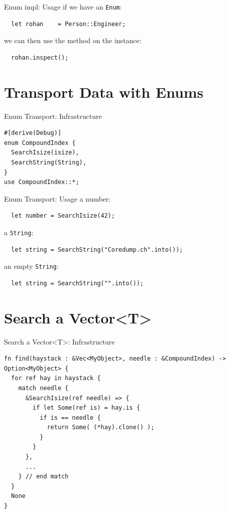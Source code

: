 \documentclass[aspectratio=1610,t]{beamer}
\begin{document}
\begin{frame}[fragile]{Enum impl: Usage}
if we have an \texttt{Enum}:
  \begin{verbatim}
  let rohan    = Person::Engineer;
  \end{verbatim}

we can then use the method on the instance:
  \begin{verbatim}
  rohan.inspect();
  \end{verbatim}
\end{frame}




{
\section{Transport Data with Enums}
}

\begin{frame}[fragile]{Enum Transport: Infrastructure}
\begin{verbatim}
#[derive(Debug)]
enum CompoundIndex {
  SearchIsize(isize),
  SearchString(String),
}
use CompoundIndex::*;
\end{verbatim}
\end{frame}


\begin{frame}[fragile]{Enum Transport: Usage}
a number:
  \begin{verbatim}
  let number = SearchIsize(42);
  \end{verbatim}

\pause
a \texttt{String}:
  \begin{verbatim}
  let string = SearchString("Coredump.ch".into());
  \end{verbatim}

\pause
an empty \texttt{String}:
  \begin{verbatim}
  let string = SearchString("".into());
  \end{verbatim}
\end{frame}


{
\section{Search a Vector<T>}
}

\begin{frame}[fragile]{Search a Vector<T>: Infrastructure}
\begin{verbatim}
fn find(haystack : &Vec<MyObject>, needle : &CompoundIndex) -> Option<MyObject> {
  for ref hay in haystack {
    match needle {
      &SearchIsize(ref needle) => {
        if let Some(ref is) = hay.is {
          if is == needle {
            return Some( (*hay).clone() );
          }
        }
      },
      ...
    } // end match
  }
  None
}
\end{verbatim}
\end{frame}
\end{document}
